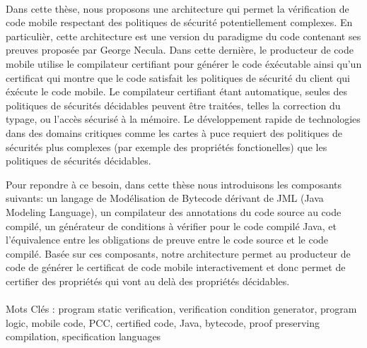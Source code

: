 \paragraph{}
Dans cette th\`ese, nous proposons une architecture qui
 permet la v\'erification de code mobile respectant des politiques de
s\'ecurit\'e potentiellement complexes.
 En particuli\`er, cette architecture est une version du paradigme du code
 contenant ses preuves propos\'ee par George Necula. Dans cette
derni\`ere, le producteur de code
 mobile utilise le compilateur certifiant pour g\'en\'erer le code
\'ex\'ecutable ainsi qu'un certificat qui montre que le code
 satisfait les politiques de s\'ecurit\'e du client qui \'ex\'ecute le
code mobile. Le  compilateur certifiant \'etant automatique,
 seules des politiques de s\'ecurit\'es d\'ecidables peuvent \^etre
trait\'ees, telles la correction du typage, ou l'acc\`es s\'ecuris\'e
 \`a la m\'emoire. Le d\'eveloppement rapide de technologies
 dans des domains  critiques comme les cartes \`a puce requiert des
politiques de s\'ecurit\'es  plus complexes (par exemple des propri\'et\'es fonctionelles) que les politiques de
s\'ecurit\'es d\'ecidables.

 Pour repondre \`a ce besoin,  dans cette th\`ese nous introduisons
les composants suivants:
 un langage de Mod\'elisation de Bytecode d\'erivant de JML
 (Java Modeling Language), un compilateur des annotations du code
source au code compil\'e, un g\'en\'erateur de conditions \`a
v\'erifier pour le code compil\'e Java, et l'\'equivalence entre les
obligations de preuve entre le code source et le code compil\'e.
Bas\'ee sur ces composants, notre architecture permet au producteur de
code de g\'en\'erer le certificat de code mobile interactivement et donc permet de certifier des propri\'et\'es qui vont au del\`a 
des propri\'et\'es d\'ecidables. 

\paragraph{}
Mots Cl\'es : program static verification, verification condition generator,  program logic, mobile code, PCC, certified code,
 Java, bytecode, proof preserving compilation, specification languages    
